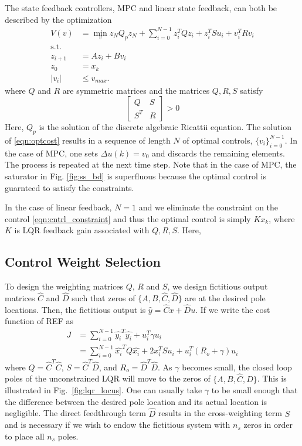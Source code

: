 \documentclass[journal,twocolumn,twoside]{IEEEtran}
\begin{document}
The state feedback controllers, MPC and linear state feedback, can both be described by the optimization
\begin{align}
V(v) &= \min_{v} z_{N}Q_{p}z_{N} + \sum_{i=0}^{N-1}z_{i}^{T}Qz_{i} + z^T_iSu_i + v^{T}_{i}Rv_{i} \label{eqn:optcost}\\
 \text{s.t.} & \nonumber\\
z_{i+1} &= Az_{i} + Bv_{i}\\
z_{0} &= x_{k}\\
|v_i | & \leq v_{max}.\label{eqn:cntrl_constraint}
\end{align}
where $Q$ and $R$ are symmetric matrices and the matrices $Q,R,S$ satisfy
\begin{equation}
  \begin{bmatrix}
    Q & S\\S^T &R
  \end{bmatrix} > 0
\end{equation}
Here, $Q_p$ is the solution of the discrete algebraic Ricattii equation. The solution of \eqref{eqn:optcost} results in a sequence of length $N$ of optimal controls, $\{v_i\}_{i=0}^{N-1}$. In the case of MPC, one sets $\Delta u(k) = v_0$ and discards the remaining elements. The process is repeated at the next time step. Note that in the case of MPC, the saturator in Fig. \ref{fig:ss_bd} is superfluous because the optimal control is guarnteed to satisfy the constraints.

In the case of linear feedback, $N=1$ and we eliminate the constraint on the control \eqref{eqn:cntrl_constraint} and thus the optimal control is simply $Kx_k$, where $K$ is LQR feedback gain associated with $Q, R,S$. Here, 

\subsection{Control Weight Selection}
To design the weighting matrices $Q$, $R$ and $S$, we design fictitious output matrices $\hat C$ and $\hat D$ such that zeros of $\{A, B, \hat C, \hat D\}$ are at the desired pole locations. Then, the fictitious output is $\hat y = \hat C x + \hat D u$. If we write the cost function of REF as
\begin{align}
  J &= \sum_{i=0}^{N-1} \hat{y_i}^T\hat{y_i} + u_i^T\gamma u_i\\
    &= \sum_{i=0}^{N-1} \hat{x_i}^TQ\hat{x_i} + 2x_i^TSu_i + u_i^T(R_o+\gamma)u_i
\end{align}
where $Q = \hat{C}^T\hat{C}$, $S =\hat{C}^T \hat{D}$, and $R_o = \hat{D}^T\hat{D}$. As $\gamma$ becomes small, the closed loop poles of the unconstrained LQR will move to the zeros of $\{A, B, \hat C, \hat D\}$. This is illustrated in Fig.~\ref{fig:lqr_locus}. One can usually take $\gamma$ to be small enough that the difference between the desired pole location and its actual location is negligible. The direct feedthrough term $\hat D$ results in the cross-weighting term $S$ and is necessary if we wish to endow the fictitious system with $n_s$ zeros in order to place all $n_s$ poles.
\end{document}
